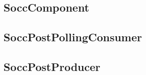 \subsection{SoccComponent} %
\label{sub:socccomponent}


\subsection{SoccPostPollingConsumer} %
\label{sub:soccpostpollingconsumer}


\subsection{SoccPostProducer} %
\label{sub:soccpostproducer}



